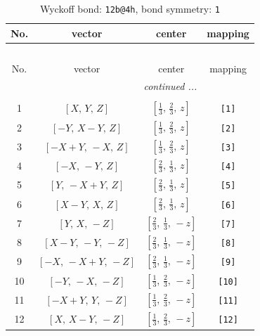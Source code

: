 \documentclass[fleqn,8pt]{jsarticle}
\begin{document}
\begin{longtable}{cccc}
\caption{Wyckoff bond: {\tt 12b@4h}, bond symmetry: {\tt 1}}
 \\
 \hline \hline
No. & vector & center & mapping \\ \hline \endfirsthead

\multicolumn{3}{l}{\tablename\ \thetable{}} \\
 \hline \hline
No. & vector & center & mapping \\ \hline \endhead

 \hline \hline
\multicolumn{3}{r}{\footnotesize\it continued ...} \\ \endfoot

 \hline \hline
\multicolumn{3}{r}{} \\ \endlastfoot

1 & $\left[ X,\, Y,\, Z \right]$ & $\left[ \frac{1}{3},\, \frac{2}{3},\, z \right]$ & {\tt [1]} \\ \hline
2 & $\left[ - Y,\, X - Y,\, Z \right]$ & $\left[ \frac{1}{3},\, \frac{2}{3},\, z \right]$ & {\tt [2]} \\ \hline
3 & $\left[ - X + Y,\, - X,\, Z \right]$ & $\left[ \frac{1}{3},\, \frac{2}{3},\, z \right]$ & {\tt [3]} \\ \hline
4 & $\left[ - X,\, - Y,\, Z \right]$ & $\left[ \frac{2}{3},\, \frac{1}{3},\, z \right]$ & {\tt [4]} \\ \hline
5 & $\left[ Y,\, - X + Y,\, Z \right]$ & $\left[ \frac{2}{3},\, \frac{1}{3},\, z \right]$ & {\tt [5]} \\ \hline
6 & $\left[ X - Y,\, X,\, Z \right]$ & $\left[ \frac{2}{3},\, \frac{1}{3},\, z \right]$ & {\tt [6]} \\ \hline
7 & $\left[ Y,\, X,\, - Z \right]$ & $\left[ \frac{2}{3},\, \frac{1}{3},\, - z \right]$ & {\tt [7]} \\ \hline
8 & $\left[ X - Y,\, - Y,\, - Z \right]$ & $\left[ \frac{2}{3},\, \frac{1}{3},\, - z \right]$ & {\tt [8]} \\ \hline
9 & $\left[ - X,\, - X + Y,\, - Z \right]$ & $\left[ \frac{2}{3},\, \frac{1}{3},\, - z \right]$ & {\tt [9]} \\ \hline
10 & $\left[ - Y,\, - X,\, - Z \right]$ & $\left[ \frac{1}{3},\, \frac{2}{3},\, - z \right]$ & {\tt [10]} \\ \hline
11 & $\left[ - X + Y,\, Y,\, - Z \right]$ & $\left[ \frac{1}{3},\, \frac{2}{3},\, - z \right]$ & {\tt [11]} \\ \hline
12 & $\left[ X,\, X - Y,\, - Z \right]$ & $\left[ \frac{1}{3},\, \frac{2}{3},\, - z \right]$ & {\tt [12]} \\
\end{longtable}
\end{document}
